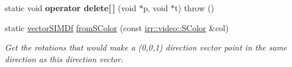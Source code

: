 \begin{DoxyCompactItemize}
\item 
static void {\bfseries operator delete\mbox{[}$\,$\mbox{]}} (void $\ast$p, void $\ast$t)  throw ()\hypertarget{classirr_1_1core_1_1vectorSIMDf_a7bb9eb3909b14536fdd58c55db8f66e9}{}\label{classirr_1_1core_1_1vectorSIMDf_a7bb9eb3909b14536fdd58c55db8f66e9}

\item 
static \hyperlink{classirr_1_1core_1_1vectorSIMDf}{vector\+S\+I\+M\+Df} \hyperlink{classirr_1_1core_1_1vectorSIMDf_ae4f75658be1be29840c568031800d55d}{from\+S\+Color} (const \hyperlink{classirr_1_1video_1_1SColor}{irr\+::video\+::\+S\+Color} \&col)\hypertarget{classirr_1_1core_1_1vectorSIMDf_ae4f75658be1be29840c568031800d55d}{}\label{classirr_1_1core_1_1vectorSIMDf_ae4f75658be1be29840c568031800d55d}

\begin{DoxyCompactList}\small\item\em Get the rotations that would make a (0,0,1) direction vector point in the same direction as this direction vector. \end{DoxyCompactList}\end{DoxyCompactItemize}
